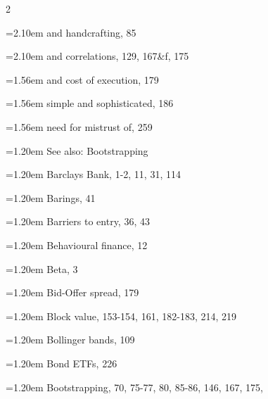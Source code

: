 {\begin{multicols}{2}
\par \noindent\hangindent=2.10em\hspace*{0.90em} and handcrafting, 85
\par \noindent\hangindent=2.10em\hspace*{0.90em} and correlations, 129, 167\&f, 175
\par \noindent\hangindent=1.56em\hspace*{0.36em} and cost of execution, 179
\par \noindent\hangindent=1.56em\hspace*{0.36em} simple and sophisticated, 186
\par \noindent\hangindent=1.56em\hspace*{0.36em} need for mistrust of, 259
\par \noindent\hangindent=1.20em\hspace*{0.00em} See also: Bootstrapping
\par \noindent\hangindent=1.20em\hspace*{0.00em} Barclays Bank, 1-2, 11, 31, 114
\par \noindent\hangindent=1.20em\hspace*{0.00em} Barings, 41
\par \noindent\hangindent=1.20em\hspace*{0.00em} Barriers to entry, 36, 43
\par \noindent\hangindent=1.20em\hspace*{0.00em} Behavioural finance, 12
\par \noindent\hangindent=1.20em\hspace*{0.00em} Beta, 3
\par \noindent\hangindent=1.20em\hspace*{0.00em} Bid-Offer spread, 179
\par \noindent\hangindent=1.20em\hspace*{0.00em} Block value, 153-154, 161, 182-183, 214, 219
\par \noindent\hangindent=1.20em\hspace*{0.00em} Bollinger bands, 109
\par \noindent\hangindent=1.20em\hspace*{0.00em} Bond ETFs, 226
\par \noindent\hangindent=1.20em\hspace*{0.00em} Bootstrapping, 70, 75-77, 80, 85-86, 146, 167, 175,

\end{multicols}}
